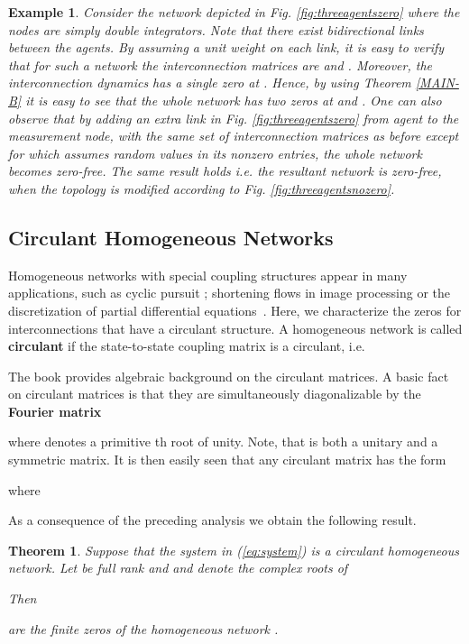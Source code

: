 \documentclass[twocolumn]{autart}    \usepackage{amsmath}
\newtheorem{theorem}{Theorem}
\newtheorem{example}{Example}
\begin{document}
\begin{example}
Consider the network depicted in Fig. \ref{fig:threeagentszero} where the nodes are  simply double integrators. Note that there exist   bidirectional links between the  agents.  By assuming a unit weight on each link, it is easy to verify that for such a network  the interconnection matrices are   and . Moreover,  the interconnection dynamics
has a single zero at . Hence, by using   Theorem \ref{MAIN-B} it is easy to see that the whole network has two zeros at  and .   One can also observe that by adding an extra link in Fig. \ref{fig:threeagentszero} from  agent   to the measurement node, with the same set of interconnection matrices  as before except for  which assumes random values in its nonzero entries, the whole network becomes \textit{zero-free}. The same result holds i.e.  the resultant network is zero-free, when the topology  is modified according to Fig. \ref{fig:threeagentsnozero}.

\end{example}







\subsection{Circulant Homogeneous Networks}
Homogeneous networks with special coupling structures appear in many
applications, such as cyclic pursuit \cite{MarshallBrouckeFrancis};
shortening flows in image processing \cite{Bruckstein} or the
discretization of partial differential
equations~\cite{brockett-willems}.  Here, we characterize the zeros for
interconnections that have a  circulant
structure.
A homogeneous network is called \textbf{circulant}
if the state-to-state coupling matrix  is a circulant, i.e.

The book   \cite{davis} provides algebraic background on the circulant matrices.
A  basic fact on circulant matrices is that they are simultaneously diagonalizable by the \textbf{Fourier matrix}

where   denotes a primitive th root of
unity. Note, that  is both a unitary and a symmetric
matrix.
It is then easily seen that any circulant matrix
 has the form

 where

As a consequence of the preceding analysis we obtain the following result.

\begin{theorem} Suppose that the system in (\ref{eq:system}) is a circulant homogeneous network.  Let  be full rank and  and 
denote the complex roots of

Then

are the finite zeros of the homogeneous network .
\end{theorem}
\end{document}
